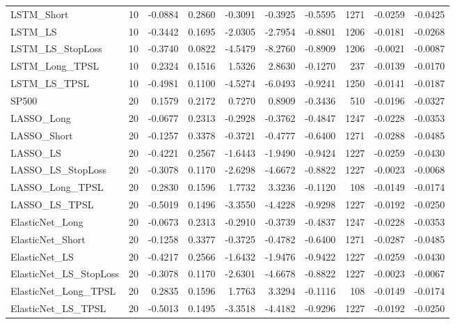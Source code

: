 \begin{tabular}{llrrrrrrrr}
\cline{1-10}
LSTM\_Short & 10 & -0.0884 & 0.2860 & -0.3091 & -0.3925 & -0.5595 & 1271 & -0.0259 & -0.0425 \\
\cline{1-10}
LSTM\_LS & 10 & -0.3442 & 0.1695 & -2.0305 & -2.7954 & -0.8801 & 1206 & -0.0181 & -0.0268 \\
\cline{1-10}
LSTM\_LS\_StopLoss & 10 & -0.3740 & 0.0822 & -4.5479 & -8.2760 & -0.8909 & 1206 & -0.0021 & -0.0087 \\
\cline{1-10}
LSTM\_Long\_TPSL & 10 & 0.2324 & 0.1516 & 1.5326 & 2.8630 & -0.1270 & 237 & -0.0139 & -0.0170 \\
\cline{1-10}
LSTM\_LS\_TPSL & 10 & -0.4981 & 0.1100 & -4.5274 & -6.0493 & -0.9241 & 1250 & -0.0141 & -0.0187 \\
\cline{1-10}
SP500 & 20 & 0.1579 & 0.2172 & 0.7270 & 0.8909 & -0.3436 & 510 & -0.0196 & -0.0327 \\
\cline{1-10}
LASSO\_Long & 20 & -0.0677 & 0.2313 & -0.2928 & -0.3762 & -0.4847 & 1247 & -0.0228 & -0.0353 \\
\cline{1-10}
LASSO\_Short & 20 & -0.1257 & 0.3378 & -0.3721 & -0.4777 & -0.6400 & 1271 & -0.0288 & -0.0485 \\
\cline{1-10}
LASSO\_LS & 20 & -0.4221 & 0.2567 & -1.6443 & -1.9490 & -0.9424 & 1227 & -0.0259 & -0.0430 \\
\cline{1-10}
LASSO\_LS\_StopLoss & 20 & -0.3078 & 0.1170 & -2.6298 & -4.6672 & -0.8822 & 1227 & -0.0023 & -0.0068 \\
\cline{1-10}
LASSO\_Long\_TPSL & 20 & 0.2830 & 0.1596 & 1.7732 & 3.3236 & -0.1120 & 108 & -0.0149 & -0.0174 \\
\cline{1-10}
LASSO\_LS\_TPSL & 20 & -0.5019 & 0.1496 & -3.3550 & -4.4228 & -0.9298 & 1227 & -0.0192 & -0.0250 \\
\cline{1-10}
ElasticNet\_Long & 20 & -0.0673 & 0.2313 & -0.2910 & -0.3739 & -0.4837 & 1247 & -0.0228 & -0.0353 \\
\cline{1-10}
ElasticNet\_Short & 20 & -0.1258 & 0.3377 & -0.3725 & -0.4782 & -0.6400 & 1271 & -0.0287 & -0.0485 \\
\cline{1-10}
ElasticNet\_LS & 20 & -0.4217 & 0.2566 & -1.6432 & -1.9476 & -0.9422 & 1227 & -0.0259 & -0.0430 \\
\cline{1-10}
ElasticNet\_LS\_StopLoss & 20 & -0.3078 & 0.1170 & -2.6301 & -4.6678 & -0.8822 & 1227 & -0.0023 & -0.0067 \\
\cline{1-10}
ElasticNet\_Long\_TPSL & 20 & 0.2835 & 0.1596 & 1.7763 & 3.3294 & -0.1116 & 108 & -0.0149 & -0.0174 \\
\cline{1-10}
ElasticNet\_LS\_TPSL & 20 & -0.5013 & 0.1495 & -3.3518 & -4.4182 & -0.9296 & 1227 & -0.0192 & -0.0250 \\

\end{tabular}
